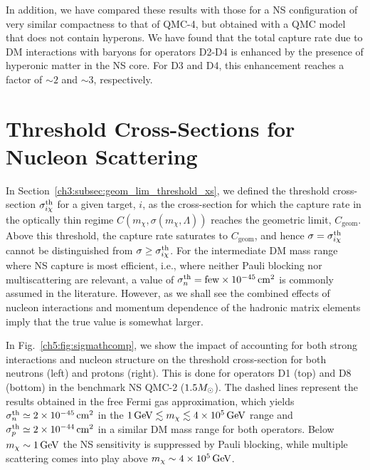 In addition, we have compared these results with those for a NS configuration of very similar compactness to that of QMC-4, but obtained with a QMC model that does not contain hyperons. We have found that the total capture rate due to DM interactions with baryons for operators D2-D4 is enhanced by the presence of hyperonic matter in the NS core. For D3 and D4, this enhancement reaches a factor of $\sim 2$ and $\sim 3$, respectively.


\section{Threshold Cross-Sections for Nucleon Scattering}
\label{ch5:sec:sigmath_results}



In Section~\ref{ch3:subsec:geom_lim_threshold_xs}, we defined the threshold cross-section $\sigma^{\rm th}_{i\chi}$ for a given target, $i$, as the cross-section for which the capture rate in the optically thin regime $C(m_\chi,\sigma(m_\chi,\Lambda))$ reaches the geometric limit, $C_\mathrm{geom}$. Above this threshold, the capture rate saturates to $C_\mathrm{geom}$, and hence $\sigma = \sigma^{\rm th}_{i\chi}$ cannot be distinguished from $\sigma\ge\sigma^{\rm th}_{i\chi}$. For the intermediate DM mass range where NS capture is most efficient, i.e., where neither Pauli blocking nor multiscattering are relevant, a value of $\sigma^\mathrm{th}_n = \textrm{few}\times10^{-45}{\rm \,cm}^2$ is commonly assumed in the literature.  However, as we shall see the combined effects of nucleon interactions and momentum dependence of the hadronic matrix elements imply that the true value is somewhat larger. 


In Fig.~\ref{ch5:fig:sigmathcomp}, we show the impact of accounting for both strong interactions and nucleon structure on the threshold cross-section for both neutrons (left) and protons (right). This is done for operators D1 (top) and D8 (bottom) in the benchmark NS QMC-2 ($1.5M_\odot$). The dashed lines represent the results obtained in the free Fermi gas approximation, which yields $\sigma^\mathrm{th}_n\simeq2\times10^{-45}{\rm \,cm}^2$ in the $1{\rm \,GeV}\lesssim m_\chi\lesssim 4\times 10^5{\rm \,GeV}$ range and $\sigma^\mathrm{th}_p\simeq2\times10^{-44}{\rm \,cm}^2$ in a similar DM mass range for both operators. Below $m_\chi\sim1{\rm \,GeV}$ the NS sensitivity is suppressed by Pauli blocking, while multiple scattering comes into play above $m_\chi\sim4\times10^5{\rm \,GeV}$. 

